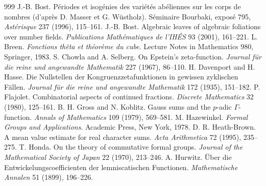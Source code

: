 \begin{thebibliography}{999}
 J.-B. Bost. P\'eriodes et isog\'enies des vari\'et\'es ab\'eliennes sur les corps de nombres (d'apr\`es D. Masser et G. W\"ustholz). S\'eminaire Bourbaki, expos\'e 795, \emph{Ast\'erisque} 237 (1996), 115--161.
 J.-B. Bost. Algebraic leaves of algebraic foliations over number fields. \emph{Publications Math\'ematiques de l'IH\'ES} 93 (2001), 161--221.
 L. Breen. \emph{Fonctions th\^eta et th\'eor\`eme du cube}. Lecture Notes in Mathematics 980, Springer, 1983.
 S. Chowla and A. Selberg. On Epstein's zeta-function. \emph{Journal f\"ur die reine und angewandte Mathematik} 227 (1967), 86--110.
 H. Davenport and H. Hasse. Die Nullstellen der Kongruenzzetafunktionen in gewissen zyklischen F\"allen. \emph{Journal f\"ur die reine und angewandte Mathematik} 172 (1935), 151--182.
 P. Flajolet. Combinatorial aspects of continued fractions. \emph{Discrete Mathematics} 32 (1980), 125--161.
 B. H. Gross and N. Koblitz. Gauss sums and the $p$-adic $\Gamma$-function. \emph{Annals of Mathematics} 109 (1979), 569--581.
 M. Hazewinkel. \emph{Formal Groups and Applications}. Academic Press, New York, 1978.
 D. R. Heath-Brown. A mean value estimate for real character sums. \emph{Acta Arithmetica} 72 (1995), 235--275.
 T. Honda. On the theory of commutative formal groups. \emph{Journal of the Mathematical Society of Japan} 22 (1970), 213--246.
 A. Hurwitz. \"Uber die Entwickelungscoefficienten der lemniscatischen Functionen. \emph{Mathematische Annalen} 51 (1899), 196--226.

\end{thebibliography}
